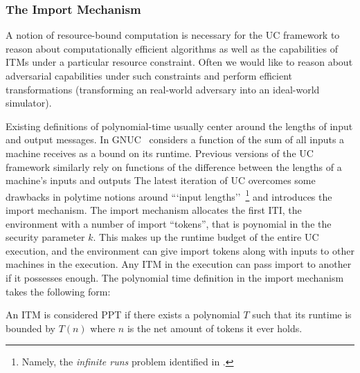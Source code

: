 
\subsubsection{The Import Mechanism}
A notion of resource-bound computation is necessary for the UC framework to reason about computationally efficient algorithms as well as the capabilities of ITMs under a particular resource constraint.
Often we would like to reason about adversarial capabilities under such constraints and perform efficient transformations (transforming an real-world adversary into an ideal-world simulator).

Existing definitions of polynomial-time usually center around the lengths of input and output messages. In GNUC~\cite{gnuc} considers a function of the sum of all inputs a machine receives as a bound on its runtime. Previous versions of the UC framework similarly rely on functions of the difference between the lengths of a machine's inputs and outputs
The latest iteration of UC overcomes some drawbacks in polytime notions around ```input lengths''~\footnote{Namely, the \emph{infinite runs} problem identified in \cite{uc}.} and introduces the import mechanism.
The import mechanism allocates the first ITI, the environment with a number of import ``tokens'', that is poynomial in the the security parameter $k$. 
This makes up the runtime budget of the entire UC execution, and the environment can give import tokens along with inputs to other machines in the execution. Any ITM in the execution can pass import to another if it possesses enough.
The polynomial time definition in the import mechanism takes the following form:

\begin{center} {\small An ITM is considered PPT if there exists a polynomial $T$ such that its runtime is bounded by $T(n)$ where $n$ is the net amount of tokens it ever holds.} \end{center}

